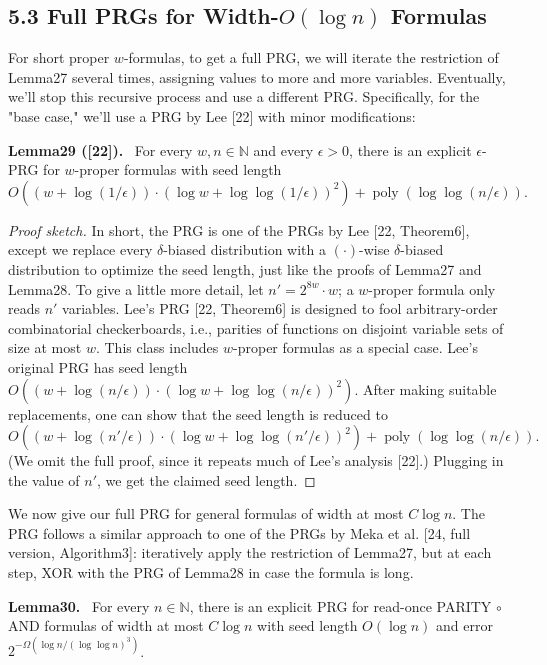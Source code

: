 \documentclass[10pt,a4paper]{article}
\newenvironment{authorclaim}[1]{\par\medskip\noindent\textbf{#1.}\ \ignorespaces}{\par\medskip}
\begin{document}
\subsection*{5.3 Full PRGs for Width-$O(\log n)$ Formulas}
For short proper $w$-formulas, to get a full PRG, we will iterate the restriction of Lemma27 several times, assigning values to more and more variables. Eventually, we'll stop this recursive process and use a different PRG. Specifically, for the "base case," we'll use a PRG by Lee [22] with minor modifications:
\begin{authorclaim}{Lemma29 ([22])}
For every $w,n\in\mathbb N$ and every $\epsilon>0$, there is an explicit $\epsilon$-PRG for $w$-proper formulas with seed length
\[
O((w+\log(1/\epsilon))\cdot(\log w+\log\log(1/\epsilon))^2)
+\operatorname{poly}(\log\log(n/\epsilon)).
\]
\end{authorclaim}
\begin{proof}[Proof sketch]
In short, the PRG is one of the PRGs by Lee [22, Theorem6], except we replace every $\delta$-biased distribution with a $(\cdot)$-wise $\delta$-biased distribution to optimize the seed length, just like the proofs of Lemma27 and Lemma28.
To give a little more detail, let $n'=2^{8w}\cdot w$; a $w$-proper formula only reads $n'$ variables. Lee's PRG [22, Theorem6] is designed to fool arbitrary-order combinatorial checkerboards, i.e., parities of functions on disjoint variable sets of size at most $w$. This class includes $w$-proper formulas as a special case. Lee's original PRG has seed length $O((w+\log(n/\epsilon))\cdot(\log w+\log\log(n/\epsilon))^2)$.
After making suitable replacements, one can show that the seed length is reduced to
\[
O((w+\log(n'/\epsilon))\cdot(\log w+\log\log(n'/\epsilon))^2)
+\operatorname{poly}(\log\log(n/\epsilon)).
\]
(We omit the full proof, since it repeats much of Lee's analysis [22].) Plugging in the value of $n'$, we get the claimed seed length.
\end{proof}
We now give our full PRG for general formulas of width at most $C\log n$. The PRG follows a similar approach to one of the PRGs by Meka et al. [24, full version, Algorithm3]: iteratively apply the restriction of Lemma27, but at each step, XOR with the PRG of Lemma28 in case the formula is long.
\begin{authorclaim}{Lemma30}
For every $n\in\mathbb N$, there is an explicit PRG for read-once PARITY $\circ$ AND formulas of width at most $C\log n$ with seed length $O(\log n)$ and error $2^{-\Omega(\log n/(\log\log n)^3)}$.
\end{authorclaim}
\end{document}
